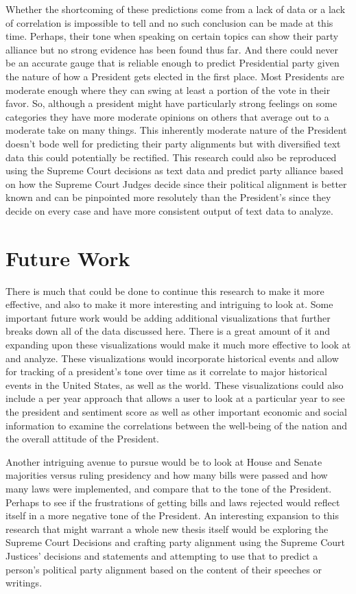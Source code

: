 Whether the shortcoming of these predictions come from a lack of data or a lack of correlation is impossible to tell and no such conclusion can be made at this time.
Perhaps, their tone when speaking on certain topics can show their party alliance but no strong evidence has been found thus far.
And there could never be an accurate gauge that is reliable enough to predict Presidential party given the nature of how a President gets elected in the first place.
Most Presidents are moderate enough where they can swing at least a portion of the vote in their favor.
So, although a president might have particularly strong feelings on some categories they have more moderate opinions on others that average out to a moderate take on many things.
This inherently moderate nature of the President doesn't bode well for predicting their party alignments but with diversified text data this could potentially be rectified.
This research could also be reproduced using the Supreme Court decisions as text data and predict party alliance based on how the Supreme Court Judges decide since their political alignment is better known and can be pinpointed more resolutely than the President's since they decide on every case and have more consistent output of text data to analyze.

\section{Future Work}
There is much that could be done to continue this research to make it more effective, and also to make it more interesting and intriguing to look at.
Some important future work would be adding additional visualizations that further breaks down all of the data discussed here.
There is a great amount of it and expanding upon these visualizations would make it much more effective to look at and analyze.
These visualizations would incorporate historical events and allow for tracking of a president's tone over time as it correlate to major historical events in the United States, as well as the world.
These visualizations could also include a per year approach that allows a user to look at a particular year to see the president and sentiment score as well as other important economic and social information to examine the correlations between the well-being of the nation and the overall attitude of the President.

Another intriguing avenue to pursue would be to look at House and Senate majorities versus ruling presidency and how many bills were passed and how many laws were implemented, and compare that to the tone of the President.
Perhaps to see if the frustrations of getting bills and laws rejected would reflect itself in a more negative tone of the President.
An interesting expansion to this research that might warrant a whole new thesis itself would be exploring the Supreme Court Decisions and crafting party alignment using the Supreme Court Justices' decisions and statements and attempting to use that to predict a person's political party alignment based on the content of their speeches or writings.

